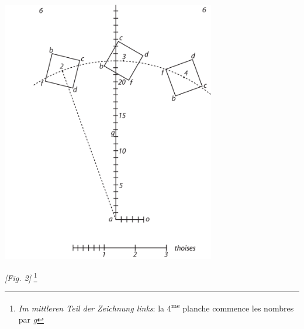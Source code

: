 \protect\newpage
\begin{center}
\includegraphics[width=0.7\textwidth]{images/T6-Desargues}
\\\rule[-4mm]{0mm}{10mm}\textit{[Fig. 2]}
\footnote{\textit{Im mittleren Teil der Zeichnung links}: la 4\textsuperscript{me} planche commence les nombres par \textit{g}}
\end{center}

